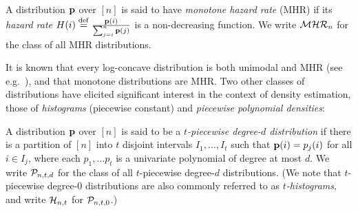 \begin{definition}\label{def:mhr}
  A distribution $\D$ over $[n]$ is said to have \emph{monotone hazard rate} (MHR) if its \emph{hazard rate} $H(i)\eqdef \frac{\D(i)}{\sum_{j=i}^{n} \D(j)}$ is a non-decreasing function. We write $\classmhr$ for the class of all MHR distributions.
\end{definition}
It is known that every log-concave distribution is both unimodal and MHR (see e.g.~\cite[Proposition 10]{An:96}), and that monotone distributions are MHR. Two other classes of distributions have elicited significant interest in the context of density estimation, those of \emph{histograms} (piecewise constant) and \emph{piecewise polynomial densities}:
\begin{definition}\label{def:piecewise}
  A distribution $\D$ over $[n]$ is said to be a \emph{$t$-piecewise degree-$d$ distribution} if there is a partition of $[n]$ into $t$ disjoint intervals $I_1,\dots,I_t$ such that $\D(i) = p_j(i)$ for all $i \in I_j$, where each $p_1,\dots p_t$ is a univariate polynomial of degree at most $d$. We write $\classpoly$ for the class of all $t$-piecewise degree-$d$ distributions. (We note that {$t$-piecewise degree-$0$ distributions} are also commonly referred to as \emph{$t$-histograms}, and write $\classhist$ for $\classpoly[t,0]$.)
\end{definition}

